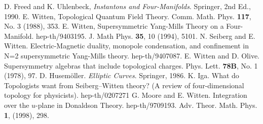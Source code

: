 \documentclass[12pt, onecolumn]{article}
\begin{document}

\begin{thebibliography}{9}
 D. Freed and K. Uhlenbeck, \textit{Instantons and Four-Manifolds}.  Springer, 2nd Ed., 1990.
 E. Witten, Topological Quantum Field Theory.  Comm. Math. Phys. \textbf{117}, No. 3 (1988), 353.
 E. Witten, Supersymmetric Yang-Mills Theory on a Four-Manifold. hep-th/9403195.  J. Math Phys. \textbf{35}, 10 (1994), 5101.
 N. Seiberg and E. Witten.  Electric-Magnetic duality, monopole condensation, and confinement in N=2 supersymmetric Yang-Mills theory. hep-th/9407087.
 E. Witten and D. Olive.  Supersymmetry algebras that include topological charges.  Phys. Lett. \textbf{78B}, No. 1 (1978), 97.
 D. Husem\"{o}ller. \textit{Elliptic Curves}.  Springer, 1986.
 K. Iga. What do Topologists want from Seiberg--Witten theory? (A review of four-dimensional topology for physicists). hep-th/0207271
 G. Moore and E. Witten.  Integration over the $u$-plane in Donaldson Theory. hep-th/9709193. Adv. Theor. Math. Phys. \textbf{1}, (1998), 298.
\end{thebibliography}
\end{document}

